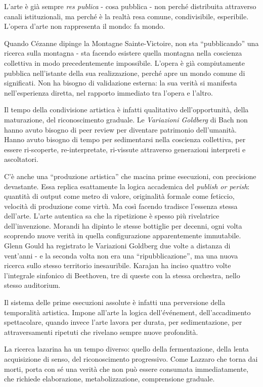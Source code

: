 L'arte è già sempre \emph{res publica} - cosa pubblica - non perché distribuita
attraverso canali istituzionali, ma perché è la realtà resa comune, condivisibile,
esperibile. L'opera d'arte non rappresenta il mondo: fa mondo.

Quando Cézanne dipinge la Montagne Sainte-Victoire, non sta “pubblicando” una
ricerca sulla montagna - sta facendo esistere quella montagna nella coscienza
collettiva in modo precedentemente impossibile. L'opera è già compiutamente
pubblica nell'istante della sua realizzazione, perché apre un mondo comune di
significati. Non ha bisogno di validazione esterna: la sua verità si manifesta
nell'esperienza diretta, nel rapporto immediato tra l'opera e l'altro.

Il tempo della condivisione artistica è infatti qualitativo dell'opportunità,
della maturazione, del riconoscimento graduale. Le \emph{Variazioni Goldberg} di
Bach non hanno avuto bisogno di peer review per diventare patrimonio dell'umanità.
Hanno avuto bisogno di tempo per sedimentarsi nella coscienza collettiva, per
essere ri-scoperte, re-interpretate, ri-vissute attraverso generazioni interpreti
e ascoltatori.

C'è anche una “produzione artistica” che macina prime esecuzioni, con precisione
devastante. Essa replica esattamente la logica accademica del \emph{publish or
perish}: quantità di output come metro di valore, originalità formale come
feticcio, velocità di produzione come virtù. Ma così facendo tradisce l'essenza
stessa dell'arte. L'arte autentica sa che la ripetizione è spesso più rivelatrice
dell'invenzione. Morandi ha dipinto le stesse bottiglie per decenni, ogni volta
scoprendo nuove verità in quella configurazione apparentemente immutabile.
Glenn Gould ha registrato le Variazioni Goldberg due volte a distanza di
vent'anni - e la seconda volta non era una “ripubblicazione”, ma una nuova
ricerca sullo stesso territorio inesauribile. Karajan ha inciso quattro volte
l'integrale sinfonico di Beethoven, tre di queste con la stessa orchestra, nello
stesso auditorium.

Il sistema delle prime esecuzioni assolute è infatti una perversione della
temporalità artistica. Impone all'arte la logica dell'événement, dell'accadimento
spettacolare, quando invece l'arte lavora per durata, per sedimentazione,
per attraversamenti ripetuti che rivelano sempre nuove profondità.

La ricerca lazarina ha un tempo diverso: quello della fermentazione, della lenta
acquisizione di senso, del riconoscimento progressivo. Come Lazzaro che torna
dai morti, porta con sé una verità che non può essere consumata immediatamente,
che richiede elaborazione, metabolizzazione, comprensione graduale.

